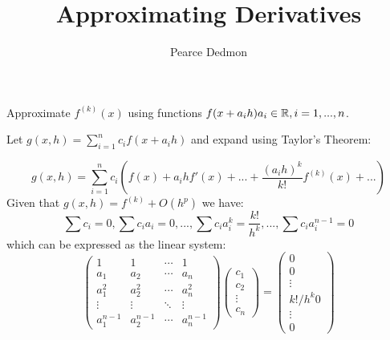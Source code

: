 \documentclass[a4paper,10pt]{article}
\begin{document}
\title{Approximating Derivatives}
\author{Pearce Dedmon}
\date{}
\maketitle

\begin{prop}[]
	Approximate $f^{(k)}(x)$ using functions $f(x+a_ih) a_i \in \mathbb{R}, \\i=1,...,n$.
\end{prop}

\begin{soln}
	Let $g(x,h) = \sum_{i=1}^n c_if(x+a_ih)$ and expand using Taylor's Theorem:

	\[ g(x,h) = \sum_{i=1}^n c_i \left( f(x) + a_ihf'(x) + ... + \frac{(a_ih)^k}{k!}f^{(k)}(x) + ... \right) \]
	Given that $g(x,h) = f^{(k)} + O(h^p)$ we have:
	\[ \sum c_i = 0, \sum c_ia_i = 0, ..., \sum c_ia_i^k = \frac{k!}{h^k}, ..., \sum c_ia_i^{n-1} = 0 \]
	which can be expressed as the linear system:
	\[
		\begin{pmatrix}
			1 & 1 & \cdots & 1 \\
			a_1 & a_2 & \cdots & a_n \\
			a_1^2 & a_2^2 & \cdots & a_n^2 \\
			\vdots & \vdots & \ddots & \vdots \\
			a_1^{n-1} & a_2^{n-1} & \cdots & a_n^{n-1}
		\end{pmatrix}
		\begin{pmatrix}
			c_1 \\
			c_2 \\
			\vdots \\
			c_n
		\end{pmatrix}
		=
		\begin{pmatrix}
			0 \\
			0 \\
			\vdots \\
			k! / h^k
			0 \\
			\vdots \\
			0
		\end{pmatrix}
	\]
\end{soln}
\end{document}
